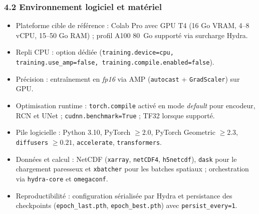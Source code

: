 \documentclass[12pt,a4paper]{article}
\begin{document}
\subsubsection*{4.2 Environnement logiciel et mat\'eriel}
\begin{itemize}
    \item Plateforme cible de r\'ef\'erence : Colab Pro avec GPU T4 (16 Go VRAM, 4--8 vCPU, 15--50 Go RAM) ; profil A100 80~Go support\'e via surcharge Hydra.
    \item Repli CPU : option d\'edi\'ee (\texttt{training.device=cpu, training.use\_amp=false, training.compile.enabled=false}).
    \item Pr\'ecision : entra\^inement en \emph{fp16} via AMP (\texttt{autocast} + \texttt{GradScaler}) sur GPU.
    \item Optimisation runtime : \texttt{torch.compile} activ\'e en mode \emph{default} pour encodeur, RCN et UNet ; \texttt{cudnn.benchmark=True} ; TF32 lorsque support\'e.
    \item Pile logicielle : Python 3.10, PyTorch $\geq 2.0$, PyTorch Geometric $\geq 2.3$, \texttt{diffusers} $\geq 0.21$, \texttt{accelerate}, \texttt{transformers}.
    \item Donn\'ees et calcul : NetCDF (\texttt{xarray}, \texttt{netCDF4}, \texttt{h5netcdf}), \texttt{dask} pour le chargement paresseux et \texttt{xbatcher} pour les batches spatiaux ; orchestration via \texttt{hydra-core} et \texttt{omegaconf}.
    \item Reproductibilit\'e : configuration s\'erialis\'ee par Hydra et persistance des checkpoints (\texttt{epoch\_last.pth}, \texttt{epoch\_best.pth}) avec \texttt{persist\_every=1}.
\end{itemize}
\end{document}
